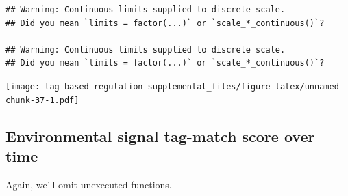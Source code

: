 \documentclass[
]{book}
\begin{document}
\begin{verbatim}
## Warning: Continuous limits supplied to discrete scale.
## Did you mean `limits = factor(...)` or `scale_*_continuous()`?

## Warning: Continuous limits supplied to discrete scale.
## Did you mean `limits = factor(...)` or `scale_*_continuous()`?
\end{verbatim}

\texttt{[image: tag-based-regulation-supplemental\_files/figure-latex/unnamed-chunk-37-1.pdf]}

\hypertarget{environmental-signal-tag-match-score-over-time}{%
\subsection{Environmental signal tag-match score over time}\label{environmental-signal-tag-match-score-over-time}}

Again, we'll omit unexecuted functions.
\end{document}
